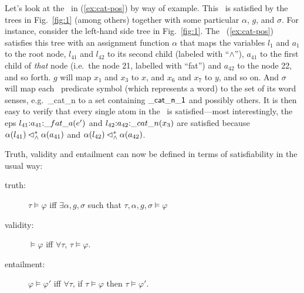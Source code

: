 Let's look at the \rmrs\ in (\ref{ex:cat-pos}) by way of example.
This \rmrs\ is satisfied by the trees in Fig.~\ref{fig:1} (among
others) together with some particular $\alpha$, $g$, and $\sigma$.
For instance, consider the left-hand side tree in Fig.~\ref{fig:1}.
The \rmrs\ (\ref{ex:cat-pos}) satisfies this tree with an assignment
function $\alpha$ that maps the variables $l_1$ and $a_1$ to the
root node, $l_{41}$ and $l_{42}$ to its second child (labeled with
``$\wedge$''), $a_{41}$ to the first child of \emph{that} node (i.e.\
the node 21, labelled with ``fat'') and $a_{42}$ to the node 22, and
so forth.  $g$ will map $x_1$ and $x_3$ to $x$, and $x_6$ and $x_7$ to
$y$, and so on.  
And $\sigma$ will map each \rmrs\ predicate symbol (which represents a
word) to the set of its word senses, e.g.\ \_cat\_n to a set
containing $\mathsf{\_cat\_n\_1}$ and possibly others.  It is then easy to verify
that every single atom in the \rmrs\ is satisfied---most
interestingly, the {\sc ep}s $l_{41} {:} a_{41} {:} \_fat\_a(e')$ and
$l_{42} {:} a_{42} {:} \_cat\_n(x_3)$ are satisfied because
$\alpha(l_{41}) \lhd^*_\wedge \alpha(a_{41})$ and $\alpha(l_{42})
\lhd^*_\wedge \alpha(a_{42})$.

Truth, validity and entailment can now be defined in terms of
satisfiability in the usual way:
\begin{definition}\label{defn:entailment}
\begin{description}
\item   [truth:] $\tau\models \varphi$ iff $\exists \alpha,g,\sigma$  such
  that $\tau,\alpha,g,\sigma\models \varphi$
\item   [validity:] $\models \varphi$ iff $\forall \tau$, $\tau\models \varphi$.
\item   [entailment:] $\varphi\models \varphi'$ iff $\forall \tau$, if
  $\tau\models \varphi$ then $\tau\models \varphi'$.
\end{description}
\end{definition}



